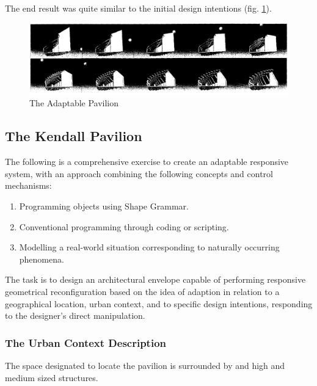 The end result was quite similar to the initial design intentions (fig. \ref{fig:FinalPav}).

\begin{figure}[htbp]
\centering
\includegraphics[width=\textwidth]{./Images/7-FinalPavilion}
\caption[Adaptable Pavilion Design Results]{The Adaptable Pavilion \cite{zulas04}}
\label{fig:FinalPav}
\end{figure}

\newpage
\subsection{The Kendall Pavilion}
\label{sec:KendallPavilion}

The following is a comprehensive exercise to create an adaptable responsive system, with an approach combining the following concepts and control mechanisms:

\begin{enumerate}
\item Programming objects using Shape Grammar.
\item Conventional programming through coding or scripting.
\item Modelling a real-world situation corresponding to naturally occurring phenomena.
\end{enumerate}

The task is to design an architectural envelope capable of performing responsive geometrical reconfiguration based on the idea of adaption in relation to a geographical location, urban context, and to specific design intentions, responding to the designer's direct manipulation.

\subsubsection{The Urban Context Description}

The space designated to locate the pavilion is surrounded by and high and medium sized structures.


